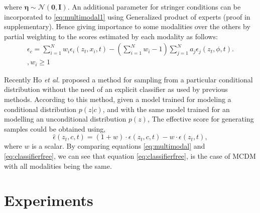 \documentclass[10pt,twocolumn,letterpaper]{article}
\begin{document}
where $\boldsymbol{\eta} \sim\mathcal{N}(\boldsymbol{0}, \boldsymbol{I})$. An additional parameter for stringer conditions can be incorporated to  \eqref{eq:multimodal1} using Generalized product of experts \cite{cao2014generalized} (proof in supplementary). Hence giving importance to some modalities over the others by partial weighting to the scores estimated by each modality as follows:
\begin{multline}
   \epsilon_{c}=
   \sum_{i=1}^N w_i \epsilon_{i}(z_t,x_i,t)- 
  (\sum_{i=1}^N w_i-1) \sum_{j=1}^N a_j \epsilon_{j}(z_t,\phi, t).\\
 ,   w_i\geq 1
   \label{eq:multimodal}
\end{multline}


Recently Ho \textit{et al.}\cite{ho2021classifier} proposed a method for sampling from a particular conditional distribution without the need of an explicit classifier as used by previous methods\cite{dhariwal2021diffusion}. According to this method, given a model trained for modeling a conditional distribution $p(z|c)$, and with the same model trained for an modelling an unconditional distribution $p(z)$, The effective score for generating samples could be obtained using,
\begin{equation}
    \hat{\epsilon}(z_t,c,t)=(1+w) \cdot \epsilon(z_t,c,t)-w \cdot \epsilon(z_t,t),
    \label{eq:classifierfree}
\end{equation}
where $w$ is a scalar. 
By comparing equations \eqref{eq:multimodal} and \eqref{eq:classifierfree}, we can see that equation \eqref{eq:classifierfree}, is the case of MCDM with all modalities being the same. 








\section{Experiments}
\end{document}
